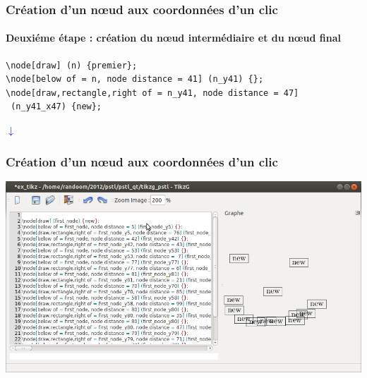 \documentclass{beamer}
\begin{document}
\begin{frame}[containsverbatim]
\frametitle{Création d'un n{\oe}ud aux coordonnées d'un clic} 
\framesubtitle{Deuxiéme étape : création du n{\oe}ud intermédiaire et du n{\oe}ud final}
\begin{verbatim}
\node[draw] (n) {premier};
\node[below of = n, node distance = 41] (n_y41) {};
\node[draw,rectangle,right of = n_y41, node distance = 47]
 (n_y41_x47) {new};
\end{verbatim}
 
\begin{center}
{\normalsize \textcolor{blue}{$\downarrow$}}\\
\vspace{3mm}


\end{center}

\end{frame}

\begin{frame}
\frametitle{Création d'un n{\oe}ud aux coordonnées d'un clic} 
\includegraphics[scale=0.35]{img/r_6.png} 
\end{frame}
\end{document}
